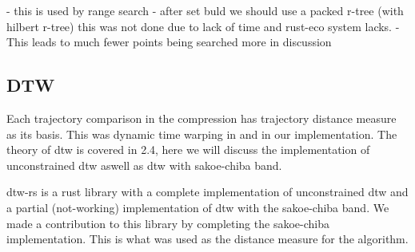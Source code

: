 - this is used by range search
- after set buld we should use a packed r-tree (with hilbert r-tree) this was not done due to lack of time and rust-eco system lacks.
- This leads to much fewer points being searched more in discussion
\subsection{DTW}
Each trajectory comparison in the compression has trajectory distance measure as its basis. This was dynamic time warping in \cite{zhao2018rest} and in our implementation. The theory of dtw is covered in 2.4, here we will discuss the implementation of unconstrained dtw aswell as dtw with sakoe-chiba band.

dtw-rs is a rust library with a complete implementation of unconstrained dtw and a partial (not-working) implementation of dtw with the sakoe-chiba band. We made a contribution to this library by completing the sakoe-chiba implementation. This is what was used as the distance measure for the algorithm.